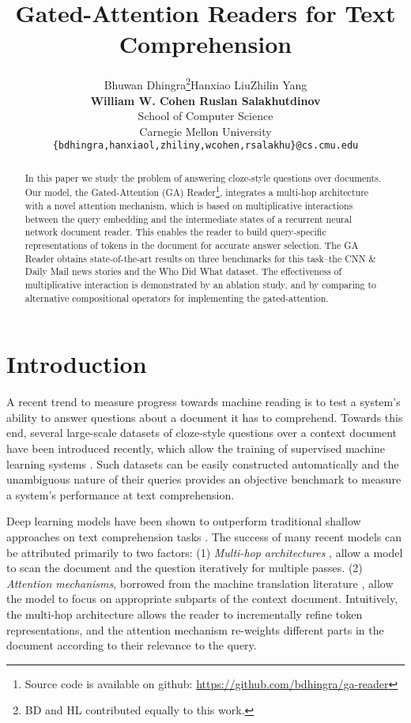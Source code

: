 \documentclass[11pt,a4paper]{article}
\title{Gated-Attention Readers for Text Comprehension}
\author{Bhuwan Dhingra\thanks{\enskip BD and HL contributed equally to this work.}\qquad Hanxiao Liu\footnotemark[1]\qquad Zhilin Yang\\ {\bf William W. Cohen \qquad Ruslan Salakhutdinov} \\
School of Computer Science\\
Carnegie Mellon University\\
\texttt{\{bdhingra,hanxiaol,zhiliny,wcohen,rsalakhu\}@cs.cmu.edu}}
\date{}
\begin{document}
\maketitle

\begin{abstract}
In this paper we study the problem of answering cloze-style questions over documents. Our model, the Gated-Attention (GA) Reader\footnote{Source code is available on github: \url{https://github.com/bdhingra/ga-reader}}, integrates a multi-hop architecture with a novel attention mechanism, which is based on multiplicative interactions between the query embedding and the intermediate states of a recurrent neural network document reader. This enables the reader to build query-specific representations of tokens in the document for accurate answer selection. The GA Reader obtains state-of-the-art results on three benchmarks for this task--the CNN \& Daily Mail news stories and the Who Did What dataset.
The effectiveness of multiplicative interaction is demonstrated by an ablation study,
and by comparing to alternative compositional operators for implementing the gated-attention. 
\end{abstract}

\section{Introduction}
A recent trend to measure progress towards machine reading is to test a system's ability to answer questions about a document it has to comprehend. Towards this end, several large-scale datasets of cloze-style questions over a context document have been introduced recently, which allow the training of supervised machine learning systems \citep{hermann2015teaching,hill2015goldilocks,onishi2016did}. Such datasets can be easily constructed automatically and the unambiguous nature of their queries provides an objective benchmark to measure a system's performance at text comprehension. 







Deep learning models have been shown to outperform traditional shallow approaches
on text comprehension tasks \citep{hermann2015teaching}.
The success of many recent models can be attributed primarily to two factors:
(1) \emph{Multi-hop architectures} 
\citep{weston2014memory, sordoni2016iterative, shen2016reasonet},
allow a model to scan the document and the question iteratively for multiple passes.
(2) \emph{Attention mechanisms},
\citep{chen2016thorough, hermann2015teaching}
borrowed from the machine translation literature \citep{bahdanau2014neural},
allow the model to focus on appropriate subparts of the context document.
Intuitively,
the multi-hop architecture allows the reader to incrementally refine token representations,
and the attention mechanism re-weights different parts in the document according to their relevance to the query.
\end{document}
